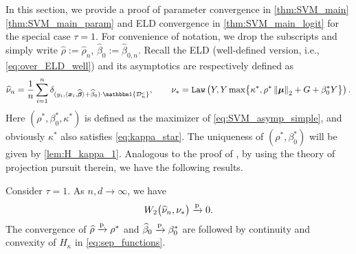 In this section, we provide a proof of parameter convergence in \cref{thm:SVM_main}\ref{thm:SVM_main_param} and ELD convergence in \ref{thm:SVM_main_logit} for the special case $\tau = 1$. For convenience of notation, we drop the subscripts and simply write $\hat\rho := \hat\rho_n$, $\hat\beta_{0} := \hat\beta_{0,n}$. 
Recall the ELD (well-defined version, i.e., \cref{eq:over_ELD_well}) and its asymptotics are respectively defined as
\begin{equation*}
    \hat \nu_{n} = \frac1n \sum_{i=1}^n \delta_{(y_i, \< \xx_i, \hat\vbeta \> + \hat\beta_{0} ) \cdot \ind\{\mathcal{D}_n^c\} },
    \qquad 
    \nu_* = \Law\left( Y,
    Y \max\bigl\{ \kappa^*, \rho^*\norm{\vmu}_2 + G + \beta_0^* Y \bigr\}
    \right).
\end{equation*}
Here $(\rho^*, \beta_0^*, \kappa^*)$ is defined as the maximizer of \cref{eq:SVM_asymp_simple}, and obviously $\kappa^*$ also satisfies \cref{eq:kappa_star}. The uniqueness of $(\rho^*, \beta_0^*)$ will be given by \cref{lem:H_kappa_1}. Analogous to the proof of \cite[Theorem 4.6]{montanari2022overparametrizedlineardimensionalityreductions}, by using the theory of projection pursuit therein, we have the following results.
\begin{lem} 
\label{lem:over_logit_conv}
Consider $\tau = 1$. As $n, d \to \infty$, we have
\begin{equation*}
    W_2 \bigl( \widehat \nu_{n}, \nu_* \bigr)
    \xrightarrow{\mathrm{p}} 0.
\end{equation*}
The convergence of $\widehat\rho \xrightarrow{\mathrm{p}} \rho^*$ and $\widehat\beta_{0} \xrightarrow{\mathrm{p}} \beta_0^*$ are followed by continuity and convexity of $H_\kappa$ in \cref{eq:sep_functions}.
\end{lem}

